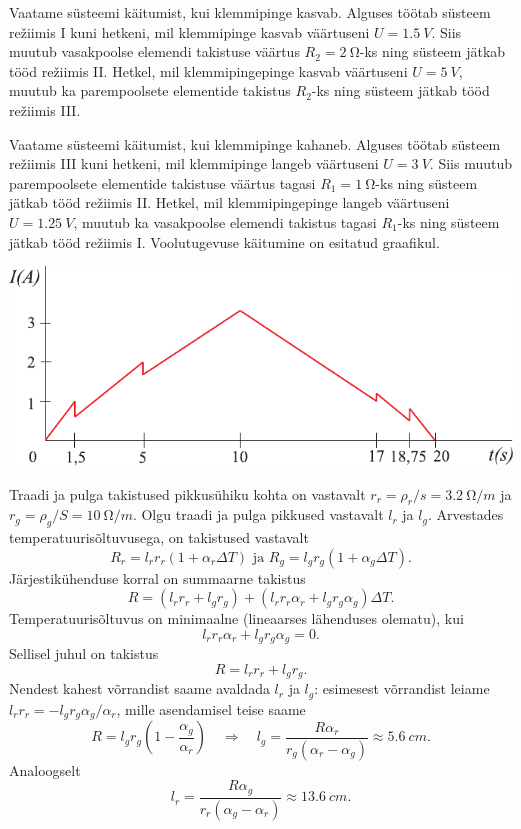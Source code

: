 \documentclass[10pt]{article}
\begin{document}
{Vaatame süsteemi käitumist, kui klemmipinge kasvab. Alguses töötab süsteem režiimis I kuni hetkeni, mil klemmipinge kasvab väärtuseni $U = \SI{1,5}{V}$. Siis muutub vasakpoolse elemendi takistuse väärtus $R_2 = \SI{2}{\ohm}$-ks ning süsteem jätkab tööd režiimis II. Hetkel, mil klemmipingepinge kasvab väärtuseni $U = \SI{5}{V}$, muutub ka parempoolsete elementide takistus $R_2$-ks ning süsteem jätkab tööd režiimis III.

Vaatame süsteemi käitumist, kui klemmipinge kahaneb. Alguses töötab süsteem režiimis III kuni hetkeni, mil klemmipinge langeb väärtuseni $U = \SI{3}{V}$. Siis muutub parempoolsete elementide takistuse väärtus tagasi $R_1 = \SI{1}{\ohm}$-ks ning süsteem jätkab tööd režiimis II. Hetkel, mil klemmipingepinge langeb väärtuseni $U = \SI{1,25}{V}$, muutub ka vasakpoolse elemendi takistus tagasi $R_1$-ks ning süsteem jätkab tööd režiimis I. Voolutugevuse käitumine on esitatud graafikul.

\begin{center}
	\includegraphics[width=0.9\linewidth]{2009-lahg-03-lah}
\end{center}
\probend
\bigskip


\solu
Traadi ja pulga takistused pikkusühiku kohta on vastavalt $r_r = \rho_r/s = \SI{3,2}{\ohm/m}$ ja $r_g = \rho_g/S = \SI{10}{\ohm/m}$. Olgu traadi ja pulga pikkused vastavalt $l_r$ ja $l_g$. Arvestades temperatuurisõltuvusega, on takistused vastavalt
\[
R_{r}=l_{r} r_{r}\left(1+\alpha_{r} \Delta T\right) \text { ja } R_{g}=l_{g} r_{g}\left(1+\alpha_{g} \Delta T\right).
\]
Järjestikühenduse korral on summaarne takistus
\[
R=\left(l_{r} r_{r}+l_{g} r_{g}\right)+\left(l_{r} r_{r} \alpha_{r}+l_{g} r_{g} \alpha_{g}\right) \Delta T.
\]
Temperatuurisõltuvus on minimaalne (lineaarses lähenduses olematu), kui
\[
l_{r} r_{r} \alpha_{r}+l_{g} r_{g} \alpha_{g}=0.
\]
Sellisel juhul on takistus
\[
R=l_{r} r_{r}+l_{g} r_{g}.
\]
Nendest kahest võrrandist saame avaldada $l_r$ ja $l_g$: esimesest võrrandist leiame $l_rr_r = -l_gr_g\alpha_g/\alpha_r$, mille asendamisel teise saame
\[
R=l_{g} r_{g}\left(1-\frac{\alpha_{g}}{\alpha_{r}}\right) \quad \Rightarrow \quad l_{g}=\frac{R \alpha_{r}}{r_{g}\left(\alpha_{r}-\alpha_{g}\right)} \approx \SI{5,6}{cm}.
\]
Analoogselt
\[
l_{r}=\frac{R \alpha_{g}}{r_{r}\left(\alpha_{g}-\alpha_{r}\right)} \approx \SI{13,6}{cm}.
\]
\probend
\bigskip

}
\end{document}
